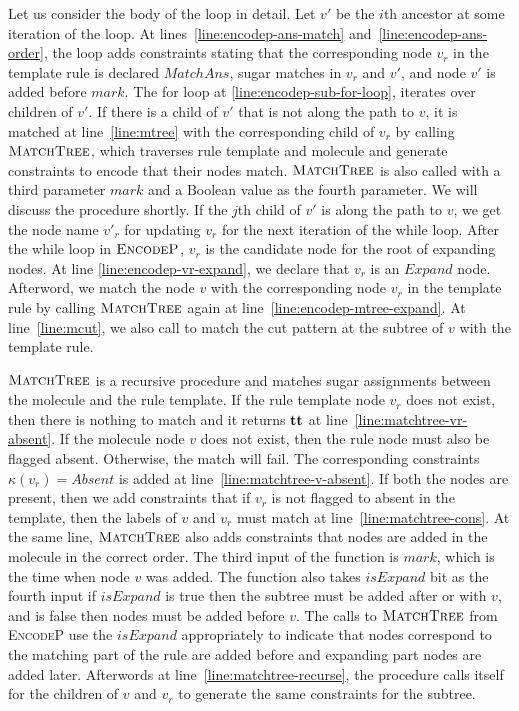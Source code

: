 Let us consider the body of the loop in detail.
Let $v'$ be the $i$th ancestor at some iteration of the loop.
At lines~\ref{line:encodep-ans-match} and~\ref{line:encodep-ans-order}, the loop adds constraints stating that the corresponding node $v_r$ in the template rule is
declared $MatchAns$, sugar matches in $v_r$ and $v'$, and
node $v'$ is added before $mark$.
The for loop at \ref{line:encodep-sub-for-loop}, iterates over
children of $v'$.
If there is a child of $v'$ that is not along the path to
$v$, it is matched at line~\ref{line:mtree} with the corresponding
child of $v_r$ by calling $\textsc{MatchTree}$, which traverses
rule template and molecule and generate constraints to encode that their
nodes match.
$\textsc{MatchTree}$ is also called with a third parameter
$mark$ and a Boolean value as the fourth parameter.
We will discuss the procedure shortly.
If the $j$th child of $v'$ is along the path to $v$,
we get the node name $v'_r$ for updating
$v_r$ for the next iteration of the while loop.
After the while loop in $\textsc{EncodeP}$, $v_r$ is the
candidate node for the root of expanding nodes.
At line \ref{line:encodep-vr-expand}, we declare that $v_r$
is an $Expand$ node.
Afterword, we match the node $v$
with the corresponding node $v_r$ in the template rule by calling
$\textsc{MatchTree}$ again at line~\ref{line:encodep-mtree-expand}.
At line~\ref{line:mcut}, we also call to match the cut pattern at
the subtree of $v$ with the template rule.

$\textsc{MatchTree}$ is a recursive procedure and matches
sugar assignments between the molecule and the rule template.
If the rule template node $v_r$ does not exist, then
there is nothing to match and it returns $\mathbf{tt}$ at
line~\ref{line:matchtree-vr-absent}.
If the molecule node $v$ does not exist, then the rule node must also
be flagged absent. Otherwise, the match will fail.
The corresponding constraints $\kappa(v_r) = Absent$ is added
at line~\ref{line:matchtree-v-absent}.
If both the nodes are present, then we add constraints
that if $v_r$ is not flagged to absent in the template, then
the labels of $v$ and $v_r$ must match at line~\ref{line:matchtree-cons}.
At the same line, $\textsc{MatchTree}$ also adds constraints that
nodes are added in the molecule in the correct order.
The third input of the function is $mark$, which is the time when
node $v$ was added. 
The function also takes $isExpand$ bit as the fourth input if
$isExpand$ is true then the subtree must be added after
or with $v$, and is
false then nodes must be added before $v$.
The calls to $\textsc{MatchTree}$ from \textsc{EncodeP} use the
$isExpand$ appropriately to indicate that nodes correspond to the
matching part of the rule are added before and expanding part nodes
are added later.
Afterwords at line~\ref{line:matchtree-recurse},
the procedure calls itself for the children of $v$ and $v_r$ to
generate the same constraints for the subtree.

